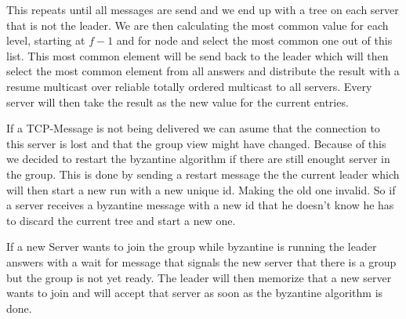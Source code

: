 \documentclass[runningheads]{llncs}
\begin{document}
This repeats until all messages are send and we end up with a tree on each
server that is not the leader. We are then calculating the most common value
for each level, starting at $f - 1$ and for node and select the most common one
out of this list. This most common element will be send back to the leader
which will then select the most common element from all answers and distribute
the result with a resume multicast over reliable totally ordered multicast to
all servers. Every server will then take the result as the new value for the
current entries.

If a TCP-Message is not being delivered we can asume that the connection to
this server is lost and that the group view might have changed. Because of this
we decided to restart the byzantine algorithm if there are still enought server
in the group. This is done by sending a restart message the the current leader
which will then start a new run with a new unique id. Making the old one
invalid. So if a server receives a byzantine message with a new id that he
doesn't know he has to discard the current tree and start a new one.

If a new Server wants to join the group while byzantine is running the leader
answers with a wait for message that signals the new server that there is a
group but the group is not yet ready. The leader will then memorize that a new
server wants to join and will accept that server as soon as the byzantine
algorithm is done.
\end{document}
